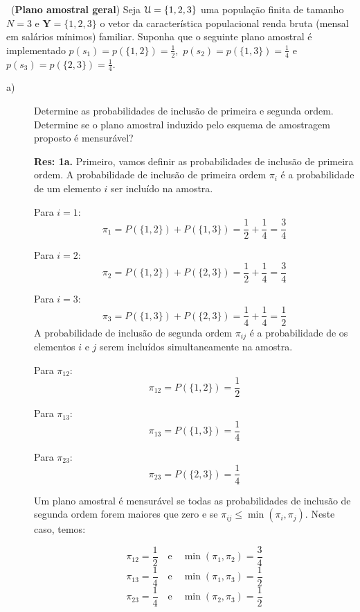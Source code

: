 \documentclass[a4paper,11pt,oneside,twocolumn]{Config/milktest}
\begin{document}
	
	\medskip 
	\question~({\bf Plano amostral geral})    Seja 
	${\cal U}=\{1,2,3\}$ uma população finita de tamanho $N=3$ e $\mathbf{Y} =\{1,2,3\}$  o vetor da característica populacional renda bruta (mensal em salários mínimos) familiar.  Suponha que o seguinte plano amostral é implementado 
	$p(s_1)=p(\{1,2\})=\frac{1}{2},$ $p(s_2)=p(\{1,3\})=\frac{1}{4}$ e
	$p(s_3)=p(\{2,3\})=\frac{1}{4}.$
	\begin{description}
		\item[a)] Determine as probabilidades de inclusão de primeira e  segunda ordem. Determine se o plano amostral induzido pelo esquema de amostragem proposto é mensurável?
		
		
		{\scriptsize
			\noindent \textbf{Res: 1a.} Primeiro, vamos definir as probabilidades de inclusão de primeira ordem. A probabilidade de inclusão de primeira ordem \(\pi_i\) é a probabilidade de um elemento \(i\) ser incluído na amostra. 
			
			Para \(i = 1\):
			\[
			\pi_1 = P(\{1, 2\}) + P(\{1, 3\}) = \frac{1}{2} + \frac{1}{4} = \frac{3}{4}
			\]
			
			Para \(i = 2\):
			\[
			\pi_2 = P(\{1, 2\}) + P(\{2, 3\}) = \frac{1}{2} + \frac{1}{4} = \frac{3}{4}
			\]
			
			Para \(i = 3\):
			\[
			\pi_3 = P(\{1, 3\}) + P(\{2, 3\}) = \frac{1}{4} + \frac{1}{4} = \frac{1}{2}
			\] 
			A probabilidade de inclusão de segunda ordem \(\pi_{ij}\) é a probabilidade de os elementos \(i\) e \(j\) serem incluídos simultaneamente na amostra.
			
			Para \(\pi_{12}\):
			\[
			\pi_{12} = P(\{1, 2\}) = \frac{1}{2}
			\]
			
			Para \(\pi_{13}\):
			\[
			\pi_{13} = P(\{1, 3\}) = \frac{1}{4}
			\]
			
			Para \(\pi_{23}\):
			\[
			\pi_{23} = P(\{2, 3\}) = \frac{1}{4}
			\]
			
			Um plano amostral é mensurável se todas as probabilidades de inclusão de segunda ordem forem maiores que zero e se \(\pi_{ij} \leq \min(\pi_i, \pi_j)\). Neste caso, temos:
			
			\[
			\pi_{12} = \frac{1}{2} \quad \text{e} \quad \min(\pi_1, \pi_2) = \frac{3}{4}
			\]
			\[
			\pi_{13} = \frac{1}{4} \quad \text{e} \quad \min(\pi_1, \pi_3) = \frac{1}{2}
			\]
			\[
			\pi_{23} = \frac{1}{4} \quad \text{e} \quad \min(\pi_2, \pi_3) = \frac{1}{2}
			\]
			
}
\end{description}
\end{document}
